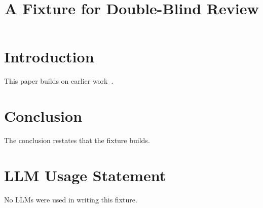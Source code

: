 \documentclass[conference,compsoc]{IEEEtran}
\begin{document}
\title{A Fixture for Double-Blind Review}
\author{}
\maketitle
\section{Introduction}
This paper builds on earlier work~\cite{knuth84,example25}.

\section{Conclusion}
The conclusion restates that the fixture builds.


\section*{LLM Usage Statement}
No LLMs were used in writing this fixture.
\end{document}
